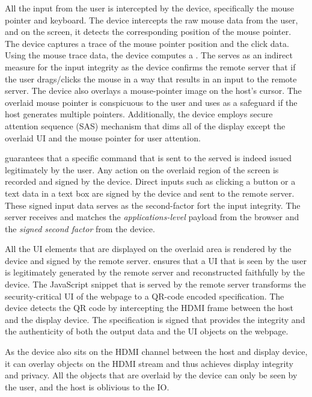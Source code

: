 \myparagraph{\Pop} All the input from the user is intercepted by the device, specifically the mouse pointer and keyboard. The device intercepts the raw mouse data from the user, and on the screen, it detects the corresponding position of the mouse pointer. The device captures a trace of the mouse pointer position and the click data. Using the mouse trace data, the device computes a \emph{\pop}. The \pop serves as an indirect measure for the input integrity as the device confirms the remote server that if the user drags/clicks the mouse in a way that results in an input to the remote server. The device also overlays a mouse-pointer image on the host's cursor. The overlaid mouse pointer is conspicuous to the user and uses as a safeguard if the host generates multiple pointers. Additionally, the device employs secure attention sequence (SAS) mechanism that dims all of the display except the overlaid UI and the mouse pointer for user attention.

\myparagraph{\poa} \Poa guarantees that a specific command that is sent to the served is indeed issued legitimately by the user. Any action on the overlaid region of the screen is recorded and signed by the device.  Direct inputs such as clicking a button or a text data in a text box are signed by the device and sent to the remote server. These signed input data serves as the second-factor fort the input integrity. The server receives and matches the \emph{applications-level} payload from the browser and the \emph{signed second factor} from the device. 

\myparagraph{\Poui} All the UI elements that are displayed on the overlaid area is rendered by the device and signed by the remote server. \Poui ensures that a UI that is seen by the user is legitimately generated by the remote server and reconstructed faithfully by the device. The JavaScript snippet that is served by the remote server transforms the security-critical UI of the webpage to a QR-code encoded specification. The device detects the QR code by intercepting the HDMI frame between the host and the display device. The specification is signed that provides the integrity and the authenticity of both the output data and the UI objects on the webpage. 

 As the device also sits on the HDMI channel between the host and display device, it can overlay objects on the HDMI stream and thus achieves display integrity and privacy. All the objects that are overlaid by the device can only be seen by the user, and the host is oblivious to the IO.


